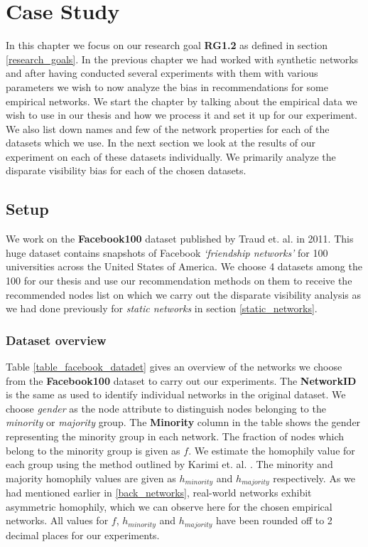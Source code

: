 \chapter{Case Study}
\label{case_study}
\thispagestyle{empty}

In this chapter we focus on our research goal \textbf{RG1.2} as defined in section \ref{research_goals}. In the previous chapter we had worked with synthetic networks and after having conducted several experiments with them with various parameters we wish to now analyze the bias in recommendations for some empirical networks. We start the chapter by talking about the empirical data we wish to use in our thesis and how we process it and set it up for our experiment. We also list down names and few of the network properties for each of the datasets which we use. In the next section we look at the results of our experiment on each of these datasets individually. We primarily analyze the disparate visibility bias for each of the chosen datasets.

\section{Setup}

We work on the \textbf{Facebook100} \cite{traud2012social} dataset published by Traud et. al. in 2011. This huge dataset contains snapshots of Facebook \textit{`friendship networks'} for 100 universities across the United States of America. We choose 4 datasets among the 100 for our thesis and use our recommendation methods on them to receive the recommended nodes list on which we carry out the disparate visibility analysis as we had done previously for \textit{static networks} in section \ref{static_networks}.

\subsection{Dataset overview}

Table \ref{table_facebook_datadet} gives an overview of the networks we choose from the \textbf{Facebook100} dataset to carry out our experiments. The \textbf{NetworkID} is the same as used to identify individual networks in the original dataset. We choose \textit{gender} as the node attribute to distinguish nodes belonging to the \textit{minority} or \textit{majority} group. The \textbf{Minority} column in the table shows the gender representing the minority group in each network. The fraction of nodes which belong to the minority group is given as $f$. We estimate the homophily value for each group using the method outlined by Karimi et. al. \cite{karimi2018homophily}. The minority and majority homophily values are given as $h_{minority}$ and $h_{majority}$ respectively. As we had mentioned earlier in \ref{back_networks}, real-world networks exhibit asymmetric homophily, which we can observe here for the chosen empirical networks. All values for $f$, $h_{minority}$ and $h_{majority}$ have been rounded off to 2 decimal places for our experiments.

